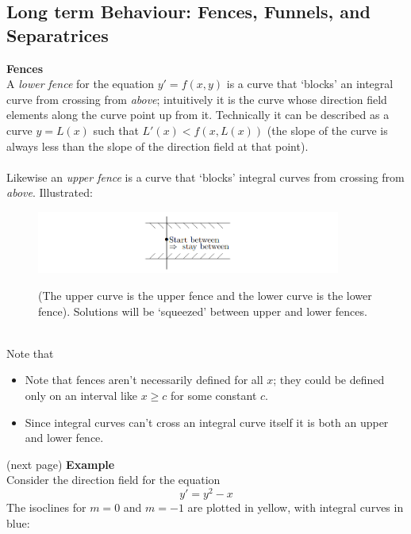 \documentclass{report}
\begin{document}
\subsection{Long term Behaviour: Fences, Funnels, and Separatrices}%
\textbf{Fences}\\
A \textit{lower fence} for the equation $y'=f(x,y)$ is a curve that `blocks' an integral curve from crossing from
\textit{above}; intuitively it is the curve whose direction field elements along the curve point up from it. Technically 
it can be described as a curve $y=L(x)$ such that $L'(x)<f(x,L(x))$ (the slope of the curve is always 
less than the slope of the direction field at that point).\\
\vspace{1mm}\\
Likewise an \textit{upper fence} is a curve that `blocks' integral curves from crossing from \textit{above}. 
Illustrated:
\begin{figure}[h]
\begin{center}
\includegraphics[width=10cm]{3}\\
\end{center}
(The upper curve is the upper fence and the lower curve is the lower fence). Solutions will be `squeezed' between
upper and lower fences.
\end{figure}\\
Note that
\begin{itemize}
\item Note that fences aren't necessarily defined for all $x$; they could be defined only on an interval like
$x\geq c$ for some constant $c$.
\item Since integral curves can't cross an integral curve itself it is both an upper and lower fence.
\end{itemize}
(next page)
\newpage
\noindent\textbf{Example}\\
Consider the direction field for the equation
\begin{equation*}
y'=y^2-x
\end{equation*}
The isoclines for $m=0$ and $m=-1$ are plotted in yellow, with integral curves in blue:
\end{document}

